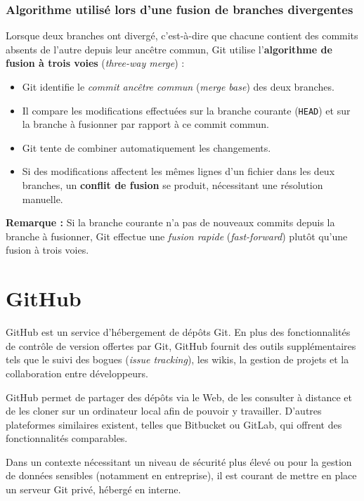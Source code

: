 \documentclass{article}
\begin{document}
\subsubsection{Algorithme utilisé lors d'une fusion de branches divergentes}

Lorsque deux branches ont divergé, c’est-à-dire que chacune contient des commits absents de l’autre depuis leur ancêtre commun, Git utilise l’\textbf{algorithme de fusion à trois voies} (\emph{three-way merge}) :

\begin{itemize}
    \item Git identifie le \emph{commit ancêtre commun} (\emph{merge base}) des deux branches.
    \item Il compare les modifications effectuées sur la branche courante (\texttt{HEAD}) et sur la branche à fusionner par rapport à ce commit commun.
    \item Git tente de combiner automatiquement les changements.
    \item Si des modifications affectent les mêmes lignes d’un fichier dans les deux branches, un \textbf{conflit de fusion} se produit, nécessitant une résolution manuelle.
\end{itemize}

\textbf{Remarque :}  
Si la branche courante n’a pas de nouveaux commits depuis la branche à fusionner, Git effectue une \emph{fusion rapide} (\emph{fast-forward}) plutôt qu’une fusion à trois voies.





\newpage
\section{GitHub}

GitHub est un service d’hébergement de dépôts Git. En plus des fonctionnalités de contrôle de version offertes par Git, GitHub fournit des outils supplémentaires tels que le suivi des bogues (\emph{issue tracking}), les wikis, la gestion de projets et la collaboration entre développeurs.  

GitHub permet de partager des dépôts via le Web, de les consulter à distance et de les cloner sur un ordinateur local afin de pouvoir y travailler. D’autres plateformes similaires existent, telles que Bitbucket ou GitLab, qui offrent des fonctionnalités comparables.  

Dans un contexte nécessitant un niveau de sécurité plus élevé ou pour la gestion de données sensibles (notamment en entreprise), il est courant de mettre en place un serveur Git privé, hébergé en interne.
\end{document}
